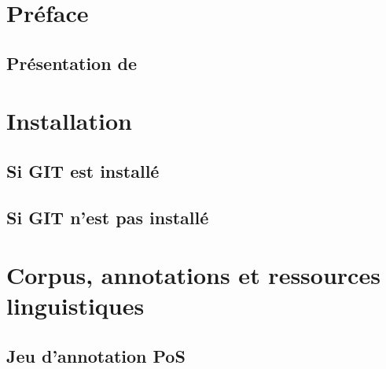 \documentclass[12pt]{article}
\title{\SEMFull}
\date{}
\begin{document}
    \maketitle
    
    \tableofcontents
    \newpage
    
    \section{Préface}
    
        \subsection{Présentation de \SEM}
        
    
    \section{Installation}
    

        \subsection{Si GIT est installé}
        

        \subsection{Si GIT n'est pas installé}
        

        \subsection{\Wapiti}
        
    
    \section{Corpus, annotations et ressources linguistiques}

        \subsection{\FTBFull}
        

        \subsection{Jeu d'annotation PoS}
        
\end{document}
